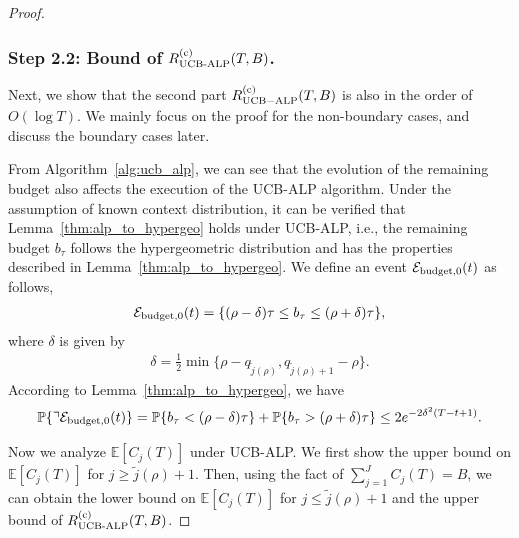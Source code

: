 \begin{proof}
\subsubsection{Step 2.2: Bound of $R_{\text{UCB-ALP}}^{\rm (c)}(T, B)$.}
Next, we show that the second part $R_{\rm {UCB-ALP}}^{({\rm c})}(T, B)$ is also in the order of $O(\log T)$.
We mainly focus on the proof for the non-boundary cases, and discuss the boundary cases later.

From Algorithm~\ref{alg:ucb_alp}, we can see that the evolution of the remaining budget also affects the execution of the UCB-ALP algorithm. Under the assumption of known context distribution, it can be verified that Lemma~\ref{thm:alp_to_hypergeo} holds under UCB-ALP, i.e., the remaining budget $b_{\tau}$ follows the hypergeometric distribution and has the properties described in Lemma~\ref{thm:alp_to_hypergeo}. We define an event $\mathcal{E}_{\rm budget, 0}(t)$ as follows,
\begin{eqnarray}
\mathcal{E}_{\rm budget, 0}(t)  = \{(\rho - \delta) \tau \leq b_{\tau} \leq (\rho + \delta) \tau\}, \nonumber
\end{eqnarray}
where $\delta$ is given by
\begin{eqnarray}
\delta = \frac{1}{2}\min\{\rho - q_{\tilde{j}(\rho)}, q_{\tilde{j}(\rho)+1} -\rho\}. \nonumber
\end{eqnarray}
According to Lemma~\ref{thm:alp_to_hypergeo}, we have
\begin{eqnarray}
\mathbb{P}\{\urcorner\mathcal{E}_{\rm budget, 0}(t)\}
= \mathbb{P}\{ b_{\tau} <  (\rho -\delta) \tau\} + \mathbb{P}\{ b_{\tau} >  (\rho +\delta) \tau\} \leq 2e^{-2\delta^2 (T-t + 1)}. \nonumber
\end{eqnarray}

Now we analyze $\mathbb{E}[C_j(T)]$ under UCB-ALP. We first show the upper bound on $\mathbb{E}[C_j(T)]$ for $j \geq \tilde{j}(\rho) + 1$. Then, using the fact of $\sum_{j = 1}^J C_j(T) = B$, we can obtain the lower bound on $\mathbb{E}[C_j(T)]$ for $j \leq \tilde{j}(\rho) + 1$ and the upper bound of $R_{\text{UCB-ALP}}^{\rm (c)}(T, B)$.


\end{proof}
